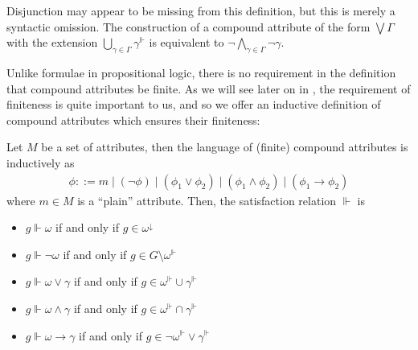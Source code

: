 Disjunction may appear to be missing from this definition, but this is merely a syntactic omission. The construction of a compound attribute
of the form $\bigvee \Gamma$ with the extension $\underset{\gamma \in \Gamma}\bigcup \gamma^{\Vdash}$ is equivalent to
$\neg \underset{\gamma \in \Gamma}\bigwedge \neg \gamma$.

Unlike formulae in propositional logic, there is no requirement in the definition that compound attributes be finite. As we will see later
on in , the requirement of finiteness is quite important to us, and so we offer an inductive
definition of compound attributes which ensures their finiteness:

\begin{definition}
  \label{definition:compound-attributes-2} Let $M$ be a set of attributes, then the language of (finite) compound attributes is inductively
  as
  \begin{align}
    \phi ::= m \mid (\neg \phi) \mid (\phi_{1}\lor \phi_{2}) \mid (\phi_{1}\land \phi_{2}) \mid (\phi_{1}\rightarrow \phi_{2})
  \end{align}
  where $m \in M$ is a ``plain'' attribute. Then, the satisfaction relation $\Vdash$ is

  \begin{itemize}
    \item $g \Vdash \omega$ if and only if $g \in \omega^{\downarrow}$

    \item $g \Vdash \neg \omega$ if and only if $g \in G \setminus \omega^{\Vdash}$

    \item $g \Vdash \omega \lor \gamma$ if and only if $g \in \omega^{\Vdash}\cup \gamma^{\Vdash}$

    \item $g \Vdash \omega \land \gamma$ if and only if $g \in \omega^{\Vdash}\cap \gamma^{\Vdash}$

    \item $g \Vdash \omega \rightarrow \gamma$ if and only if $g \in \neg \omega^{\Vdash}\lor \gamma^{\Vdash}$
  \end{itemize}
\end{definition}

